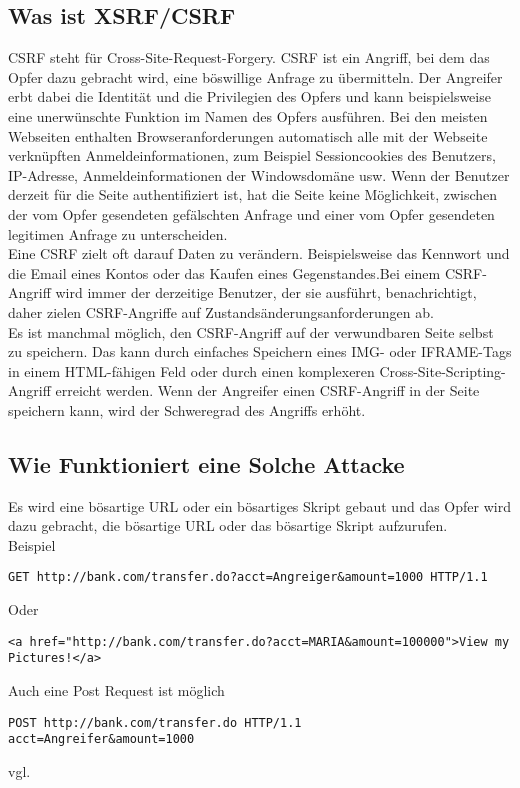{\subsection{Was ist XSRF/CSRF}
\label{sec:xsrf_what}
CSRF steht für Cross-Site-Request-Forgery. CSRF ist ein Angriff, bei dem das Opfer dazu gebracht wird, eine böswillige Anfrage zu übermitteln. Der Angreifer erbt dabei die Identität und die Privilegien des Opfers und kann beispielsweise eine unerwünschte Funktion im Namen des Opfers ausführen. Bei den meisten Webseiten enthalten Browseranforderungen automatisch alle mit der Webseite verknüpften Anmeldeinformationen, zum Beispiel Sessioncookies des Benutzers, IP-Adresse, Anmeldeinformationen der Windowsdomäne usw. Wenn der Benutzer derzeit für die Seite authentifiziert ist, hat die Seite keine Möglichkeit, zwischen der vom Opfer gesendeten gefälschten Anfrage und einer vom Opfer gesendeten legitimen Anfrage zu unterscheiden.
\\
Eine CSRF zielt oft darauf Daten zu verändern. Beispielsweise das Kennwort und die Email eines Kontos oder das Kaufen eines Gegenstandes.Bei einem CSRF-Angriff wird immer der derzeitige Benutzer, der sie ausführt, benachrichtigt, daher zielen CSRF-Angriffe auf Zustandsänderungsanforderungen ab.
\\
Es ist manchmal möglich, den CSRF-Angriff auf der verwundbaren Seite selbst zu speichern. Das kann durch einfaches Speichern eines IMG- oder IFRAME-Tags in einem HTML-fähigen Feld oder durch einen komplexeren Cross-Site-Scripting-Angriff erreicht werden. Wenn der Angreifer einen CSRF-Angriff in der Seite speichern kann, wird der Schweregrad des Angriffs erhöht. 
\subsection{Wie Funktioniert eine Solche Attacke}
\label{sec:xsrf_how}
Es wird eine bösartige URL oder ein bösartiges Skript gebaut und das Opfer wird dazu gebracht, die bösartige URL oder das bösartige Skript aufzurufen. 
\\
Beispiel
\begin{lstlisting}[caption={CSRF example}]
GET http://bank.com/transfer.do?acct=Angreiger&amount=1000 HTTP/1.1
\end{lstlisting}
Oder
\begin{lstlisting}[caption={CSRF example 2}]
<a href="http://bank.com/transfer.do?acct=MARIA&amount=100000">View my Pictures!</a>
\end{lstlisting}
Auch eine Post Request ist möglich
\\
\begin{lstlisting}[caption={CSRF example 3}]
POST http://bank.com/transfer.do HTTP/1.1
acct=Angreifer&amount=1000
\end{lstlisting}
vgl. \textcite{CSRF}
}
